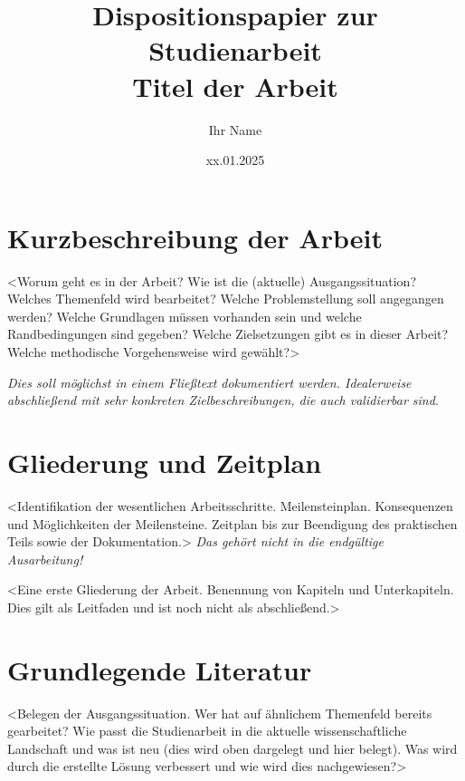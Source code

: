 \documentclass{scrartcl}
\title{Dispositionspapier zur Studienarbeit\\Titel der Arbeit}
\author{ Ihr Name }
\date{xx.01.2025}
\begin{document}
\maketitle

\section{Kurzbeschreibung der Arbeit}
<Worum geht es in der Arbeit? Wie ist die (aktuelle) Ausgangssituation? Welches
Themenfeld wird bearbeitet? Welche Problemstellung soll angegangen werden? Welche
Grundlagen müssen vorhanden sein und welche Randbedingungen sind gegeben? Welche
Zielsetzungen gibt es in dieser Arbeit? Welche methodische Vorgehensweise wird
gewählt?>

\emph{Dies soll möglichst in einem Fließtext dokumentiert werden. Idealerweise
abschließend mit sehr konkreten Zielbeschreibungen, die auch validierbar sind\/}.


\section{Gliederung und Zeitplan}
<Identifikation der wesentlichen Arbeitsschritte. Meilensteinplan. Konsequenzen
und Möglichkeiten der Meilensteine. Zeitplan bis zur Beendigung des praktischen
Teils sowie der Dokumentation.> \emph{Das gehört nicht in die endgültige Ausarbeitung!\/}

<Eine erste Gliederung der Arbeit. Benennung von
Kapiteln und Unterkapiteln. Dies gilt als Leitfaden und ist noch nicht als abschließend.>

\section{Grundlegende Literatur}
<Belegen der Ausgangssituation. Wer hat auf ähnlichem Themenfeld bereits
gearbeitet? Wie passt die Studienarbeit in die aktuelle wissenschaftliche
Landschaft und was ist neu (dies wird oben dargelegt und hier belegt). Was wird
durch die erstellte Lösung verbessert und wie wird dies nachgewiesen?>
\end{document}
